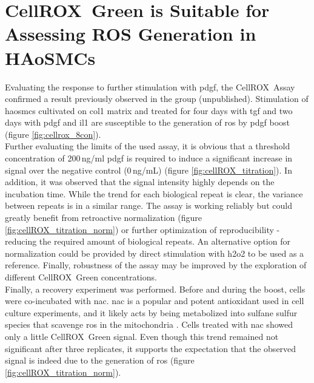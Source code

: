 \section{CellROX\texttrademark~Green is Suitable for Assessing ROS Generation in HAoSMCs}
Evaluating the response to further stimulation with \ac{pdgf}, the CellROX\texttrademark~Assay confirmed a result previously observed in the group (unpublished). Stimulation of \acp{haosmc} cultivated on \ac{col1} matrix and treated for four days with \ac{tgf} and two days with \ac{pdgf} and \ac{il1} are susceptible to the generation of \ac{ros} by \ac{pdgf} boost (figure \ref{fig:cellrox_8con}).\\
Further evaluating the limits of the used assay, it is obvious that a threshold concentration of 200\,ng/ml \ac{pdgf} is required to induce a significant increase in signal over the negative control (0\,ng/mL) (figure \ref{fig:cellROX_titration}). In addition, it was observed that the signal intensity highly depends on the incubation time. While the trend for each biological repeat is clear, the variance between repeats is in a similar range. The assay is working reliably but could greatly benefit from retroactive normalization (figure \ref{fig:cellROX_titration_norm}) or further optimization of reproducibility - reducing the required amount of biological repeats. An alternative option for normalization could be provided by direct stimulation with \ac{h2o2} to be used as a reference. Finally, robustness of the assay may be improved by the exploration of different CellROX\texttrademark~Green concentrations.\\
Finally, a recovery experiment was performed. Before and during the boost, cells were co-incubated with \ac{nac}. \ac{nac} is a popular and potent antioxidant used in cell culture experiments, and it likely acts by being metabolized into sulfane sulfur species that scavenge \ac{ros} in the mitochondria \cite{ezerinaNAcetylCysteineFunctions2018}. Cells treated with \ac{nac} showed only a little CellROX\texttrademark~Green signal. Even though this trend remained not significant after three replicates, it supports the expectation that the observed signal is indeed due to the generation of \ac{ros} (figure \ref{fig:cellROX_titration_norm}).\\

